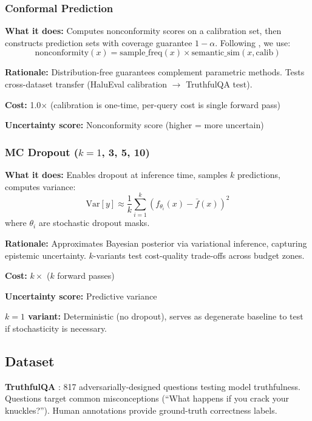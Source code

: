\subsubsection{Conformal Prediction}

\textbf{What it does:} Computes nonconformity scores on a calibration set, then constructs prediction sets with coverage guarantee $1-\alpha$. Following \cite{su2024conformal}, we use:
\begin{equation}
\text{nonconformity}(x) = \text{sample\_freq}(x) \times \text{semantic\_sim}(x, \text{calib})
\end{equation}

\textbf{Rationale:} Distribution-free guarantees complement parametric methods. Tests cross-dataset transfer (HaluEval calibration $\rightarrow$ TruthfulQA test).

\textbf{Cost:} 1.0$\times$ (calibration is one-time, per-query cost is single forward pass)

\textbf{Uncertainty score:} Nonconformity score (higher = more uncertain)

\subsubsection{MC Dropout ($k=1$, 3, 5, 10)}

\textbf{What it does:} Enables dropout at inference time, samples $k$ predictions, computes variance:
\begin{equation}
\text{Var}[y] \approx \frac{1}{k}\sum_{i=1}^{k} (f_{\theta_i}(x) - \bar{f}(x))^2
\end{equation}
where $\theta_i$ are stochastic dropout masks.

\textbf{Rationale:} Approximates Bayesian posterior via variational inference, capturing epistemic uncertainty. $k$-variants test cost-quality trade-offs across budget zones.

\textbf{Cost:} $k\times$ ($k$ forward passes)

\textbf{Uncertainty score:} Predictive variance

\textbf{$k=1$ variant:} Deterministic (no dropout), serves as degenerate baseline to test if stochasticity is necessary.

\subsection{Dataset}

\textbf{TruthfulQA} \cite{lin2021truthfulqa}: 817 adversarially-designed questions testing model truthfulness. Questions target common misconceptions (``What happens if you crack your knuckles?''). Human annotations provide ground-truth correctness labels.

